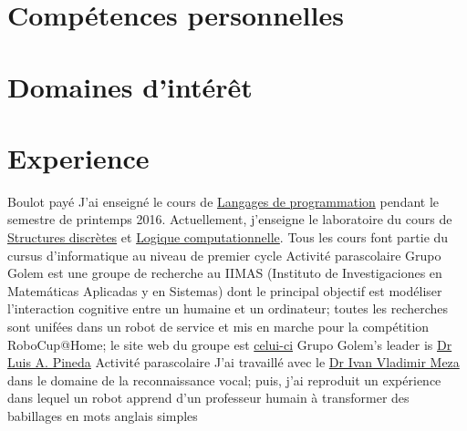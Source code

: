 \documentclass[11pt,a4paper,sans]{moderncv} %
\begin{document}
\section{Compétences personnelles}

\section{Domaines d'intérêt}


\section{Experience}
        {Boulot payé}
        {J'ai enseigné le cours de \href{https://sites.google.com/site/lengprog20162/}{Langages de programmation} pendant le semestre de printemps 2016. Actuellement, j'enseigne le laboratoire du cours de \href{https://sites.google.com/a/ciencias.unam.mx/estructuras-discretas/home}{Structures discrètes} et \href{https://sites.google.com/site/logcompunam20171/home}{Logique computationnelle}. Tous les cours font partie du cursus d'informatique au niveau de premier cycle}
        {}{}{}
        {Activité parascolaire}
        {Grupo Golem est une groupe de recherche au IIMAS (Instituto de Investigaciones en Matemáticas Aplicadas y en Sistemas) dont le principal objectif est modéliser l'interaction cognitive entre un humaine et un ordinateur; toutes les recherches sont unifées dans un robot de service et mis en marche pour la compétition RoboCup@Home; le site  web du groupe est  \href{http://golem.iimas.unam.mx/home.php?lang=en&sec=home}{celui-ci}}
        {Grupo Golem's leader is \href{http://turing.iimas.unam.mx/~luis/}{Dr Luis A. Pineda}}{}{}
        {Activité parascolaire}
        {J'ai travaillé avec le \href{http://turing.iimas.unam.mx/~ivanvladimir/}{Dr Ivan Vladimir Meza} dans le domaine de la reconnaissance vocal; puis, j'ai reproduit un expérience dans lequel un robot apprend d'un professeur humain à transformer des babillages en mots anglais simples}
        {}{}{}
\end{document}
